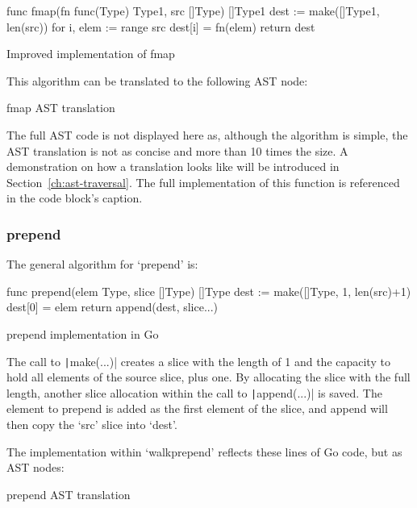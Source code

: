 \begin{listing}
	\begin{gocode}
func fmap(fn func(Type) Type1, src []Type) []Type1 {
	dest := make([]Type1, len(src))
	for i, elem := range src {
		dest[i] = fn(elem)
	}
	return dest
}
	\end{gocode}
	\caption{Improved implementation of fmap}\label{code:fmap-go-improved}
\end{listing}
This algorithm can be translated to the following AST node:

\begin{code}
	\caption{fmap AST translation\autocite{fmap-walk-implementation}}
\end{code}

The full AST code is not displayed here as, although the algorithm is simple, the AST translation
is not as concise and more than 10 times the size. A demonstration on how a translation looks like
will be introduced in Section~\ref{ch:ast-traversal}.
The full implementation of this function is referenced in the code block's caption.

\subsubsection{prepend}

The general algorithm for `prepend' is:
\begin{listing}
	\begin{gocode}
func prepend(elem Type, slice []Type) []Type {
	dest := make([]Type, 1, len(src)+1)
	dest[0] = elem
	return append(dest, slice...)
}
	\end{gocode}
	\caption{prepend implementation in Go}
\end{listing}
The call to \texttt|make(...)| creates a slice with the length of 1 and the capacity
to hold all elements of the source slice, plus one. By allocating the slice with the full
length, another slice allocation within the call to \texttt|append(...)| is saved.
The element to prepend is added as the first element of the slice, and append will then
copy the `src' slice into `dest'.

The implementation within `walkprepend' reflects these lines of Go code, but
as AST nodes:

\begin{code}
	\caption{prepend AST translation\autocite{prepend-walk-implementation}}
\end{code}
